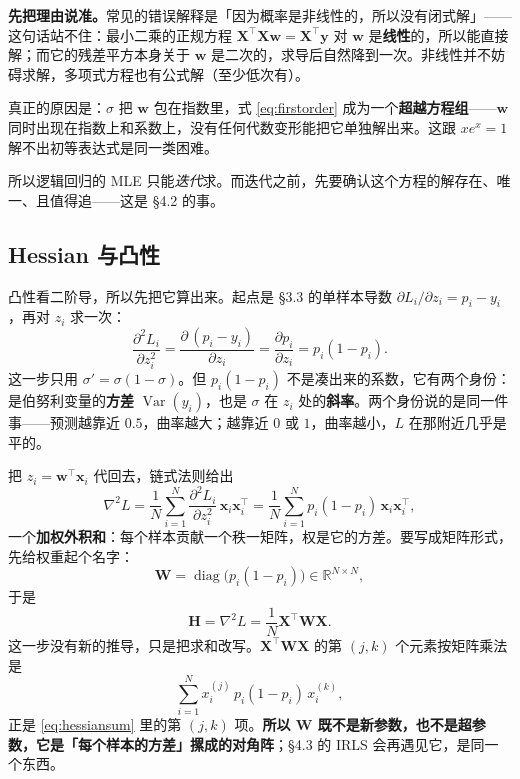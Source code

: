 \documentclass[11pt,a4paper,fontset=windows,zihao=-4]{ctexart}
\newcommand{\R}{\mathbb{R}}
\newcommand{\bX}{\mathbf{X}}
\newcommand{\by}{\mathbf{y}}
\newcommand{\bw}{\mathbf{w}}
\newcommand{\bx}{\mathbf{x}}
\newcommand{\bH}{\mathbf{H}}
\newcommand{\bW}{\mathbf{W}}
\newcommand{\tp}{^{\top}}
\DeclareMathOperator{\diag}{diag}
\DeclareMathOperator{\Var}{Var}
\begin{document}
\textbf{先把理由说准。}常见的错误解释是「因为概率是非线性的，所以没有闭式解」——这句话站不住：最小二乘的正规方程 $\bX\tp\bX\bw=\bX\tp\by$ 对 $\bw$ 是\textbf{线性}的，所以能直接解；而它的残差平方本身关于 $\bw$ 是二次的，求导后自然降到一次。非线性并不妨碍求解，多项式方程也有公式解（至少低次有）。

真正的原因是：$\sigma$ 把 $\bw$ 包在指数里，式 \eqref{eq:firstorder} 成为一个\textbf{超越方程组}——$\bw$ 同时出现在指数上和系数上，没有任何代数变形能把它单独解出来。这跟 $x e^{x}=1$ 解不出初等表达式是同一类困难。

所以逻辑回归的 MLE 只能\emph{迭代}求。而迭代之前，先要确认这个方程的解存在、唯一、且值得追——这是 \S4.2 的事。

\subsection{Hessian 与凸性}

凸性看二阶导，所以先把它算出来。起点是 \S3.3 的单样本导数 $\partial L_i/\partial z_i=p_i-y_i$，再对 $z_i$ 求一次：
\begin{equation}
  \frac{\partial^{2}L_i}{\partial z_i^{2}}
  =\frac{\partial\,(p_i-y_i)}{\partial z_i}
  =\frac{\partial p_i}{\partial z_i}
  =p_i(1-p_i).
  \label{eq:d2l}
\end{equation}
这一步只用 $\sigma'=\sigma(1-\sigma)$。但 $p_i(1-p_i)$ 不是凑出来的系数，它有两个身份：是伯努利变量的\textbf{方差} $\Var(y_i)$，也是 $\sigma$ 在 $z_i$ 处的\textbf{斜率}。两个身份说的是同一件事——预测越靠近 $0.5$，曲率越大；越靠近 $0$ 或 $1$，曲率越小，$L$ 在那附近几乎是平的。

把 $z_i=\bw\tp\bx_i$ 代回去，链式法则给出
\begin{equation}
  \nabla^{2}L
  =\frac1N\sum_{i=1}^{N}\frac{\partial^{2}L_i}{\partial z_i^{2}}\,\bx_i\bx_i\tp
  =\frac1N\sum_{i=1}^{N}p_i(1-p_i)\,\bx_i\bx_i\tp ,
  \label{eq:hessiansum}
\end{equation}
一个\textbf{加权外积和}：每个样本贡献一个秩一矩阵，权是它的方差。要写成矩阵形式，先给权重起个名字：
\begin{equation}
  \bW=\diag\bigl(p_i(1-p_i)\bigr)\in\R^{N\times N},
  \label{eq:W}
\end{equation}
于是
\begin{equation}
  \bH=\nabla^{2}L=\frac1N\bX\tp\bW\bX .
  \label{eq:hessian}
\end{equation}
这一步没有新的推导，只是把求和改写。$\bX\tp\bW\bX$ 的第 $(j,k)$ 个元素按矩阵乘法是
\[
  \sum_{i=1}^{N}x_i^{(j)}\,p_i(1-p_i)\,x_i^{(k)},
\]
正是 \eqref{eq:hessiansum} 里的第 $(j,k)$ 项。\textbf{所以 $\bW$ 既不是新参数，也不是超参数，它是「每个样本的方差」摞成的对角阵}；\S4.3 的 IRLS 会再遇见它，是同一个东西。
\end{document}
